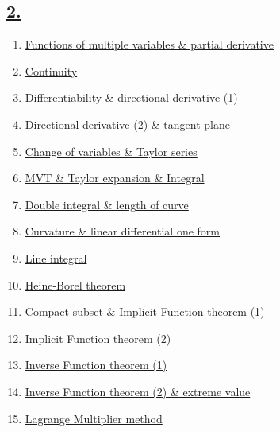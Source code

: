 \documentclass[11pt]{article}
\begin{document}
\subsection*{\href{https://www.youtube.com/playlist?list=PLVJXJebpO4Pi_4cETi8EL19qJLdcLEW2a&si=YwWo1F4e-o_KZ5_s}{2.}}

\vspace{-0.75cm}

\begin{enumerate}
	\item \href{https://mp.weixin.qq.com/s/bDhkUEZvMhreRqtfUtJLig}{Functions of multiple variables \& partial derivative}	%
	\item \href{https://mp.weixin.qq.com/s/kUzP7n_yHdNj4tn9Fty6-g}{Continuity}	%
	\item \href{https://mp.weixin.qq.com/s/AZ5YUhzyy--ws_s9xAGWeg}{Differentiability \& directional derivative (1)}	%
	\item \href{https://mp.weixin.qq.com/s/tOC1mEdZZttDdqHmah9Zqg}{Directional derivative (2) \& tangent plane}	%
	\item \href{https://mp.weixin.qq.com/s/mFU23KZzCUmfhEvfXL7_Rg}{Change of variables \& Taylor series}	%
	\item \href{https://mp.weixin.qq.com/s/JgYEAfJC-5psD7MIrfqgvQ}{MVT \& Taylor expansion \& Integral}	%
	\item \href{https://mp.weixin.qq.com/s/N1_45wIPGIKQRxs9qTMC4A}{Double integral \& length of curve}	%
	\item \href{https://mp.weixin.qq.com/s/Q2oLh8mb3pF3DAJkWp9tqA}{Curvature \& linear differential one form}	%
	\item \href{https://mp.weixin.qq.com/s/11utINvjKpiv_-qE25NnsQ}{Line integral}	%
	\item \href{https://mp.weixin.qq.com/s/pDquAXZJGuAhIiO5f5yn2A}{Heine-Borel theorem}	%
	\item \href{https://mp.weixin.qq.com/s/dar5eiTVv9u0cnkM3nfmLA}{Compact subset \& Implicit Function theorem (1)}	%
	\item \href{https://mp.weixin.qq.com/s/_JQb_vYCM8oyltC8NYS69A}{Implicit Function theorem (2)}	%
	\item \href{https://mp.weixin.qq.com/s/C1ruVdkOUj0u68DExiO9bw}{Inverse Function theorem (1)}	%
	\item \href{https://mp.weixin.qq.com/s/vuSw-YiioZSat0vNSduJzg}{Inverse Function theorem (2) \& extreme value}	%
	\item \href{https://mp.weixin.qq.com/s/FnIgRSTFcAOGlAtICzfXvA}{Lagrange Multiplier method}	%

\end{enumerate}
\end{document}

